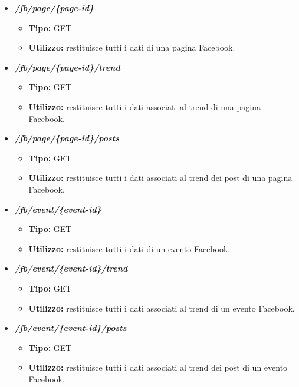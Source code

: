 \begin{itemize}
  \item \textit{\textbf{/fb/page/\{page-id\}}}
  \begin{itemize}
    \item \textbf{Tipo:} GET
    \item \textbf{Utilizzo:} restituisce tutti i dati di una pagina Facebook.
  \end{itemize}
  \item \textit{\textbf{/fb/page/\{page-id\}/trend}}
  \begin{itemize}
    \item \textbf{Tipo:} GET
    \item \textbf{Utilizzo:} restituisce tutti i dati associati al trend di una pagina Facebook.
  \end{itemize}
  \item \textit{\textbf{/fb/page/\{page-id\}/posts}}
  \begin{itemize}
    \item \textbf{Tipo:} GET
    \item \textbf{Utilizzo:} restituisce tutti i dati associati al trend dei post di una pagina Facebook.
  \end{itemize}
  \item \textit{\textbf{/fb/event/\{event-id\}}}
  \begin{itemize}
    \item \textbf{Tipo:} GET
    \item \textbf{Utilizzo:} restituisce tutti i dati di un evento Facebook.
  \end{itemize}
  \item \textit{\textbf{/fb/event/\{event-id\}/trend}}
  \begin{itemize}
    \item \textbf{Tipo:} GET
    \item \textbf{Utilizzo:} restituisce tutti i dati associati al trend di un evento Facebook.
  \end{itemize}
  \item \textit{\textbf{/fb/event/\{event-id\}/posts}}
  \begin{itemize}
    \item \textbf{Tipo:} GET
    \item \textbf{Utilizzo:} restituisce tutti i dati associati al trend dei post di un evento Facebook.
  \end{itemize}


\end{itemize}
